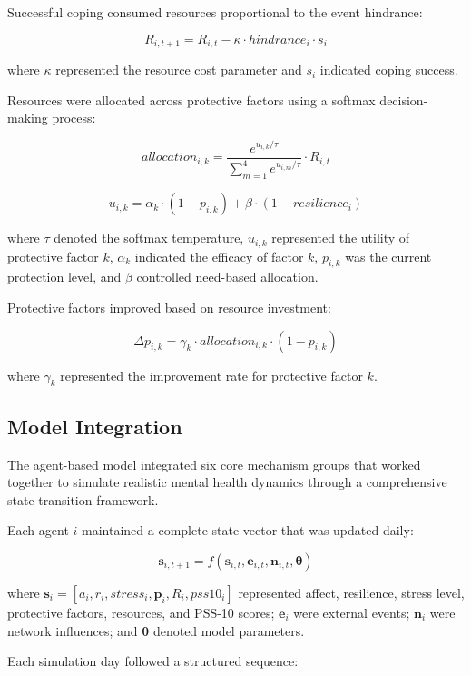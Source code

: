 \documentclass[
  letterpaper,
  DIV=11,
  numbers=noendperiod]{scrartcl}
\begin{document}
Successful coping consumed resources proportional to the event
hindrance:

\[R_{i,t+1} = R_{i,t} - \kappa \cdot hindrance_i \cdot s_i\]

where \(\kappa\) represented the resource cost parameter and \(s_i\)
indicated coping success.

Resources were allocated across protective factors using a softmax
decision-making process:

\[allocation_{i,k} = \frac{e^{u_{i,k}/\tau}}{\sum_{m=1}^4 e^{u_{i,m}/\tau}} \cdot R_{i,t}\]

\[u_{i,k} = \alpha_k \cdot (1 - p_{i,k}) + \beta \cdot (1 - resilience_i)\]

where \(\tau\) denoted the softmax temperature, \(u_{i,k}\) represented
the utility of protective factor \(k\), \(\alpha_k\) indicated the
efficacy of factor \(k\), \(p_{i,k}\) was the current protection level,
and \(\beta\) controlled need-based allocation.

Protective factors improved based on resource investment:

\[\Delta p_{i,k} = \gamma_k \cdot allocation_{i,k} \cdot (1 - p_{i,k})\]

where \(\gamma_k\) represented the improvement rate for protective
factor \(k\).

\subsection{Model Integration}\label{model-integration}

The agent-based model integrated six core mechanism groups that worked
together to simulate realistic mental health dynamics through a
comprehensive state-transition framework.

Each agent \(i\) maintained a complete state vector that was updated
daily:

\[\mathbf{s}_{i,t+1} = f(\mathbf{s}_{i,t}, \mathbf{e}_{i,t}, \mathbf{n}_{i,t}, \mathbf{\theta})\]

where
\(\mathbf{s}_i = [a_i, r_i, stress_i, \mathbf{p}_i, R_i, pss10_i]\)
represented affect, resilience, stress level, protective factors,
resources, and PSS-10 scores; \(\mathbf{e}_i\) were external events;
\(\mathbf{n}_i\) were network influences; and \(\mathbf{\theta}\)
denoted model parameters.

Each simulation day followed a structured sequence:
\end{document}
